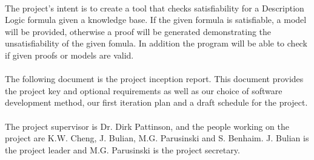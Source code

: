 \paragraph{} The project's intent is to create a tool that checks satisfiability for a Description Logic formula given a knowledge base. If the given formula is satisfiable, a model will be provided, otherwise a proof will be generated demonstrating the unsatisfiability of the given fomula. In addition the program will be able to check if given proofs or models are valid.

\paragraph{} The following document is the project inception report. This document provides the project key and optional requirements as well as our choice of software development method, our first iteration plan and a draft schedule for the project.

\paragraph{} The project supervisor is Dr. Dirk Pattinson, and the people working on the project
are K.W. Cheng, J. Bulian, M.G. Parusinski and S. Benhaim. J. Bulian is the project leader and M.G. Parusinski is the project secretary.
